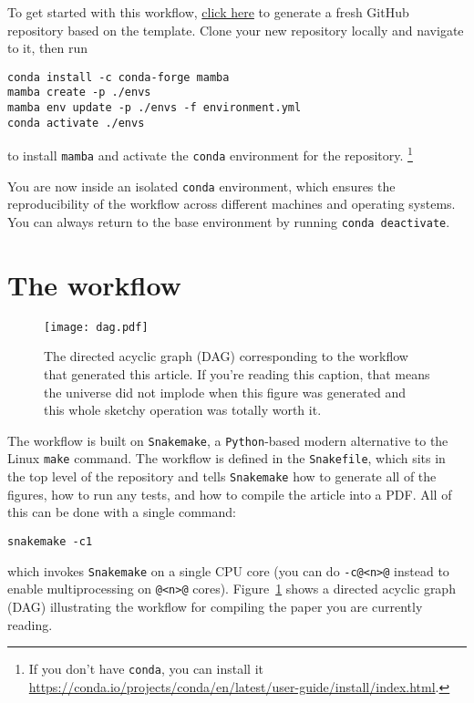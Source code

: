 \documentclass[modern]{aastex62}
\begin{document}
To get started with this workflow, \href{https://github.com/rodluger/showyourwork/generate}{click here} to generate a fresh GitHub repository based on the \showyourwork template.
Clone your new repository locally and navigate to it, then run
%
\begin{lstlisting}[style=bash]
conda install -c conda-forge mamba
mamba create -p ./envs
mamba env update -p ./envs -f environment.yml
conda activate ./envs
\end{lstlisting}
%
to install \texttt{mamba} and activate the \texttt{conda} environment for the repository.%
\footnote{If you don't have \texttt{conda}, you can install it \href{here}{https://conda.io/projects/conda/en/latest/user-guide/install/index.html}.}

You are now inside an isolated \texttt{conda} environment, which ensures the reproducibility of the workflow across different machines and operating systems. You can always return to the base environment by running \lstinline[style=bash]!conda deactivate!.

\pagebreak
\section{The workflow}

\begin{figure}[t!]
    \begin{centering}
        \texttt{[image: dag.pdf]}
        \caption{
            The directed acyclic graph (DAG) corresponding to the workflow that generated this article.
            If you're reading this caption, that means the universe did not implode when this figure was generated and this whole sketchy operation was totally worth it.
        }
        \label{fig:dag}
    \end{centering}
\end{figure}

The \showyourwork workflow is built on \texttt{Snakemake}, a \texttt{Python}-based modern alternative to the Linux \texttt{make} command.
The workflow is defined in the \texttt{Snakefile}, which sits in the top level of the repository and tells \texttt{Snakemake} how to generate all of the figures, how to run any tests, and how to compile the article into a PDF.
All of this can be done with a single command:
%
\begin{lstlisting}[style=bash]
snakemake -c1
\end{lstlisting}
%
which invokes \texttt{Snakemake} on a single CPU core (you can do \lstinline[style=bash]!-c@<n>@! instead to enable multiprocessing on \lstinline[style=bash]!@<n>@! cores). Figure~\ref{fig:dag} shows a directed acyclic graph (DAG) illustrating the workflow for compiling the paper you are currently reading.
\end{document}
